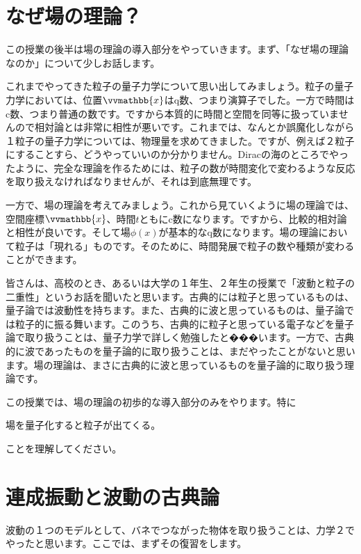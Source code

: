 \documentclass[report,paper=a4, fontsize=12pt, line_length=16cm, number_of_lines=33,dvipdfmx]{jlreq}
\newenvironment{important}{\begin{tcolorbox}[
  colback = white,
  colframe = red!35,
  boxrule = 2mm,
  fonttitle = \bfseries,
  after = \noindent] }{\end{tcolorbox}}
\numberwithin{equation}{chapter}
\newcommand{\xb}{\vvmathbb{x}}
\begin{document}
\section{なぜ場の理論？}
この授業の後半は場の理論の導入部分をやっていきます。まず、「なぜ場の理論なのか」について少しお話します。

これまでやってきた粒子の量子力学について思い出してみましょう。粒子の量子力学においては、位置$\xb$はq数、つまり演算子でした。一方で時間はc数、つまり普通の数です。ですから本質的に時間と空間を同等に扱っていませんので相対論とは非常に相性が悪いです。これまでは、なんとか誤魔化しながら１粒子の量子力学については、物理量を求めてきました。ですが、例えば２粒子にすることすら、どうやっていいのか分かりません。Diracの海のところでやったように、完全な理論を作るためには、粒子の数が時間変化で変わるような反応を取り扱えなければなりませんが、それは到底無理です。

一方で、場の理論を考えてみましょう。これから見ていくように場の理論では、空間座標$\xb$、時間$t$ともにc数になります。ですから、比較的相対論と相性が良いです。そして場$\phi(x)$が基本的なq数になります。場の理論において粒子は「現れる」ものです。そのために、時間発展で粒子の数や種類が変わることができます。

皆さんは、高校のとき、あるいは大学の１年生、２年生の授業で「波動と粒子の二重性」というお話を聞いたと思います。古典的には粒子と思っているものは、量子論では波動性を持ちます。また、古典的に波と思っているものは、量子論では粒子的に振る舞います。このうち、古典的に粒子と思っている電子などを量子論で取り扱うことは、量子力学で詳しく勉強したと���います。一方で、古典的に波であったものを量子論的に取り扱うことは、まだやったことがないと思います。場の理論は、まさに古典的に波と思っているものを量子論的に取り扱う理論です。

この授業では、場の理論の初歩的な導入部分のみをやります。特に
\begin{important}
  場を量子化すると粒子が出てくる。  
\end{important}
ことを理解してください。

\section{連成振動と波動の古典論}

波動の１つのモデルとして、バネでつながった物体を取り扱うことは、力学２でやったと思います。ここでは、まずその復習をします。
\end{document}
